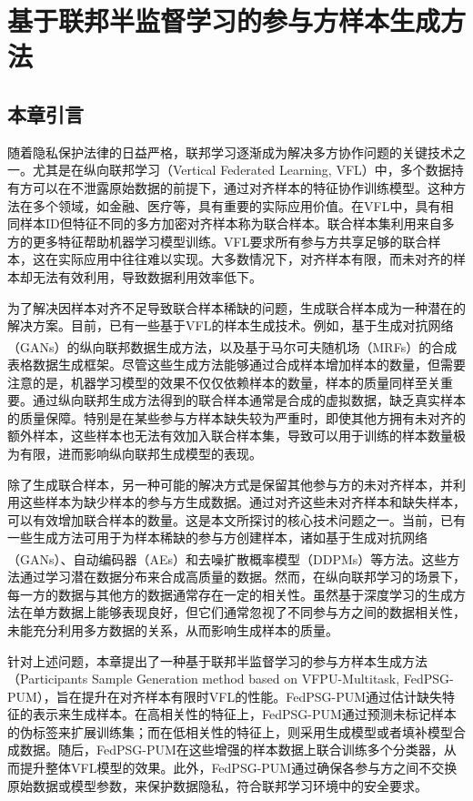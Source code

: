 \chapter{基于联邦半监督学习的参与方样本生成方法}
\thispagestyle{others}
\pagestyle{others}
\xiaosi

\section{本章引言}
随着隐私保护法律的日益严格，联邦学习逐渐成为解决多方协作问题的关键技术之一。尤其是在纵向联邦学习（Vertical Federated Learning, VFL）中，多个数据持有方可以在不泄露原始数据的前提下，通过对齐样本的特征协作训练模型。这种方法在多个领域，如金融、医疗等，具有重要的实际应用价值。在VFL中，具有相同样本ID但特征不同的多方加密对齐样本称为联合样本。联合样本集利用来自多方的更多特征帮助机器学习模型训练。VFL要求所有参与方共享足够的联合样本，这在实际应用中往往难以实现。大多数情况下，对齐样本有限，而未对齐的样本却无法有效利用，导致数据利用效率低下。

为了解决因样本对齐不足导致联合样本稀缺的问题，生成联合样本成为一种潜在的解决方案。目前，已有一些基于VFL的样本生成技术。例如，基于生成对抗网络（GANs）的纵向联邦数据生成方法，以及基于马尔可夫随机场（MRFs）\textsuperscript{\cite{MRFs}}的合成表格数据生成框架。尽管这些生成方法能够通过合成样本增加样本的数量，但需要注意的是，机器学习模型的效果不仅仅依赖样本的数量，样本的质量同样至关重要。通过纵向联邦生成方法得到的联合样本通常是合成的虚拟数据，缺乏真实样本的质量保障。特别是在某些参与方样本缺失较为严重时，即使其他方拥有未对齐的额外样本，这些样本也无法有效加入联合样本集，导致可以用于训练的样本数量极为有限，进而影响纵向联邦生成模型的表现。

除了生成联合样本，另一种可能的解决方式是保留其他参与方的未对齐样本，并利用这些样本为缺少样本的参与方生成数据。通过对齐这些未对齐样本和缺失样本，可以有效增加联合样本的数量。这是本文所探讨的核心技术问题之一。当前，已有一些生成方法可用于为样本稀缺的参与方创建样本，诸如基于生成对抗网络（GANs）、自动编码器（AEs）和去噪扩散概率模型（DDPMs）\textsuperscript{\cite{TabDDPM}}等方法。这些方法通过学习潜在数据分布来合成高质量的数据。然而，在纵向联邦学习的场景下，每一方的数据与其他方的数据通常存在一定的相关性。虽然基于深度学习的生成方法在单方数据上能够表现良好，但它们通常忽视了不同参与方之间的数据相关性，未能充分利用多方数据的关系，从而影响生成样本的质量。

针对上述问题，本章提出了一种基于联邦半监督学习的参与方样本生成方法（Participants Sample Generation method based on VFPU-Multitask, FedPSG-PUM），旨在提升在对齐样本有限时VFL的性能。FedPSG-PUM通过估计缺失特征的表示来生成样本。在高相关性的特征上，FedPSG-PUM通过预测未标记样本的伪标签来扩展训练集；而在低相关性的特征上，则采用生成模型或者填补模型合成数据。随后，FedPSG-PUM在这些增强的样本数据上联合训练多个分类器，从而提升整体VFL模型的效果。此外，FedPSG-PUM通过确保各参与方之间不交换原始数据或模型参数，来保护数据隐私，符合联邦学习环境中的安全要求。

